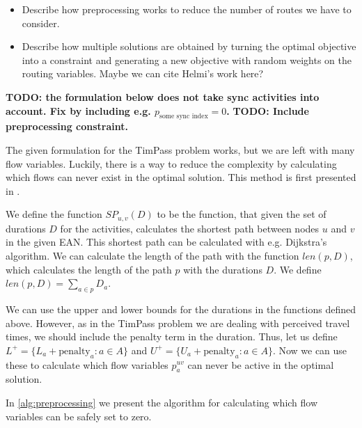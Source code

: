 \documentclass[english, 12pt, a4paper, sci, utf8, a-2b, online]{aaltothesis}
\begin{document}
\begin{itemize}
    \item Describe how preprocessing works to reduce the number of routes we have to consider.
    \item Describe how multiple solutions are obtained by turning the optimal objective into a constraint and generating a new objective with random weights on the routing variables. Maybe we can cite Helmi's work here?
\end{itemize}
\textbf{TODO: the formulation below does not take sync activities into account. Fix by including e.g. $p_{\text{some sync index}} = 0$.}
\textbf{TODO: Include preprocessing constraint.}

The given formulation for the TimPass problem works, but we are left with many flow variables. Luckily, there is a way to reduce the complexity by calculating which flows can never exist in the optimal solution. This method is first presented in \cite{schiewe2020periodic}. 

We define the function $SP_{u,v}(D)$ to be the function, that given the set of durations $D$ for the activities, calculates the shortest path between nodes $u$ and $v$ in the given EAN. This shortest path can be calculated with e.g. Dijkstra's algorithm. We can calculate the length of the path with the function $len(p, D)$, which calculates the length of the path $p$ with the durations $D$. We define $len(p, D) = \sum_{a \in p} D_a$.

We can use the upper and lower bounds for the durations in the functions defined above. However, as in the TimPass problem we are dealing with perceived travel times, we should include the penalty term in the duration. Thus, let us define $L^+ = \{L_a + \text{penalty}_a:a\in A\}$ and $U^+ = \{U_a + \text{penalty}_a:a \in A\}$. Now we can use these to calculate which flow variables $p_a^{uv}$ can never be active in the optimal solution.

In \cref{alg:preprocessing} we present the algorithm for calculating which flow variables can be safely set to zero.
\end{document}
